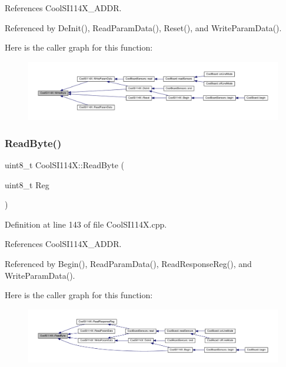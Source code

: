 References Cool\+S\+I114\+X\+\_\+\+A\+D\+DR.



Referenced by De\+Init(), Read\+Param\+Data(), Reset(), and Write\+Param\+Data().

Here is the caller graph for this function\+:\nopagebreak
\begin{figure}[H]
\begin{center}
\leavevmode
\includegraphics[width=350pt]{dd/d67/class_cool_s_i114_x_ac5c8dc5ade604da7a1c8cd1586feefc2_icgraph}
\end{center}
\end{figure}
\mbox{\label{class_cool_s_i114_x_acc20f8037e156ec4aadcbe90780b1e8b}} 
\subsubsection{\texorpdfstring{Read\+Byte()}{ReadByte()}}
{\footnotesize\ttfamily uint8\+\_\+t Cool\+S\+I114\+X\+::\+Read\+Byte (\begin{DoxyParamCaption}\item[{uint8\+\_\+t}]{Reg }\end{DoxyParamCaption})\hspace{0.3cm}{\ttfamily [private]}}



Definition at line 143 of file Cool\+S\+I114\+X.\+cpp.



References Cool\+S\+I114\+X\+\_\+\+A\+D\+DR.



Referenced by Begin(), Read\+Param\+Data(), Read\+Response\+Reg(), and Write\+Param\+Data().

Here is the caller graph for this function\+:\nopagebreak
\begin{figure}[H]
\begin{center}
\leavevmode
\includegraphics[width=350pt]{dd/d67/class_cool_s_i114_x_acc20f8037e156ec4aadcbe90780b1e8b_icgraph}
\end{center}
\end{figure}
\mbox{\label{class_cool_s_i114_x_a1d25c9e137874af529804c2ec796a6b9}} 
